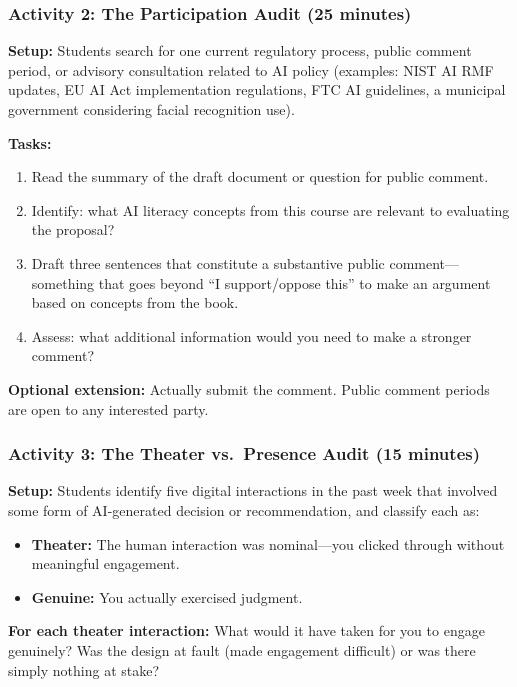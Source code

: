 \subsubsection*{Activity 2: The Participation Audit (25 minutes)}

\textbf{Setup:} Students search for one current regulatory process, public comment period, or advisory consultation related to AI policy (examples: NIST AI RMF updates, EU AI Act implementation regulations, FTC AI guidelines, a municipal government considering facial recognition use).

\textbf{Tasks:}
\begin{enumerate}
    \item Read the summary of the draft document or question for public comment.
    \item Identify: what AI literacy concepts from this course are relevant to evaluating the proposal?
    \item Draft three sentences that constitute a substantive public comment---something that goes beyond ``I support/oppose this'' to make an argument based on concepts from the book.
    \item Assess: what additional information would you need to make a stronger comment?
\end{enumerate}

\textbf{Optional extension:} Actually submit the comment. Public comment periods are open to any interested party.

\subsubsection*{Activity 3: The Theater vs.\ Presence Audit (15 minutes)}

\textbf{Setup:} Students identify five digital interactions in the past week that involved some form of AI-generated decision or recommendation, and classify each as:
\begin{itemize}
    \item \textbf{Theater:} The human interaction was nominal---you clicked through without meaningful engagement.
    \item \textbf{Genuine:} You actually exercised judgment.
\end{itemize}

\textbf{For each theater interaction:} What would it have taken for you to engage genuinely? Was the design at fault (made engagement difficult) or was there simply nothing at stake?

